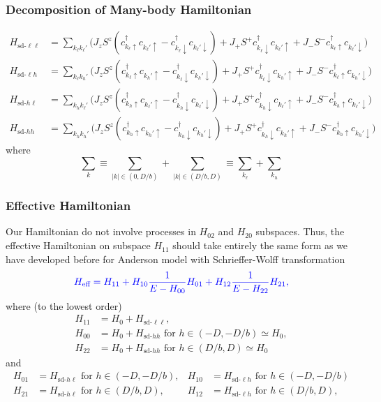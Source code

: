 \documentclass[10pt,aspectratio=43,xcolor=x11names,t]{beamer}%
\begin{document}
		\begin{frame}\frametitle{Decomposition of Many-body Hamiltonian}
			\begin{align*}
				H_{\text{sd-}\ell\ell}&=\sum_{k_\ell k_\ell'}\bigg(J_zS^z(c_{k_\ell\uparrow}^\dagger c_{k_\ell'\uparrow}-c_{k_\ell\downarrow}^\dagger c_{k_\ell'\downarrow})+J_+S^+c_{k_\ell\downarrow}^\dagger c_{k_\ell'\uparrow}+J_-S^-c_{k_\ell\uparrow}^\dagger c_{k_\ell'\downarrow}\bigg)\\
				H_{\text{sd-}\ell h}&=\sum_{k_\ell k_h'}\bigg(J_zS^z(c_{k_\ell\uparrow}^\dagger c_{k_h'\uparrow}-c_{k_\ell\downarrow}^\dagger c_{k_h'\downarrow})+J_+S^+c_{k_\ell\downarrow}^\dagger c_{k_h'\uparrow}+J_-S^-c_{k_\ell\uparrow}^\dagger c_{k_h'\downarrow}\bigg)\\
				H_{\text{sd-}h \ell}&=\sum_{k_h k_\ell'}\bigg(J_zS^z(c_{k_h\uparrow}^\dagger c_{k_\ell'\uparrow}-c_{k_h\downarrow}^\dagger c_{k_\ell'\downarrow})+J_+S^+c_{k_h\downarrow}^\dagger c_{k_\ell'\uparrow}+J_-S^-c_{k_h\uparrow}^\dagger c_{k_\ell'\downarrow}\bigg)\\
				H_{\text{sd-}h h}&=\sum_{k_h k_h'}\bigg(J_zS^z(c_{k_h\uparrow}^\dagger c_{k_h'\uparrow}-c_{k_h\downarrow}^\dagger c_{k_h'\downarrow})+J_+S^+c_{k_h\downarrow}^\dagger c_{k_h'\uparrow}+J_-S^-c_{k_h\uparrow}^\dagger c_{k_h'\downarrow}\bigg)
			\end{align*}
			where 
			\begin{equation*}
				\sum_k\equiv\sum_{|k|\in(0,D/b)}+\sum_{|k|\in(D/b,D)}\equiv\sum_{k_\ell}+\sum_{k_h}
			\end{equation*}
		\end{frame}
		\begin{frame}\frametitle{Effective Hamiltonian}
			Our Hamiltonian do not involve processes in $H_{02}$ and $H_{20}$ subspaces. Thus, the effective Hamiltonian on subspace $H_{11}$ should take entirely the same form as we have developed before for Anderson model with Schrieffer-Wolff transformation
			\begin{equation*}
				\color{blue}H_{\text{eff}}=H_{11}+H_{10}\dfrac{1}{E-H_{00}}H_{01}+H_{12}\dfrac{1}{E-H_{22}}H_{21},
			\end{equation*}
			where (to the lowest order)
			\begin{align*}
				H_{11}&=H_0+H_{\text{sd-}\ell\ell},\\
				H_{00}&=H_0+H_{\text{sd-}hh}\text{ for }h\in(-D,-D/b)\simeq H_0,\\
				H_{22}&=H_0+H_{\text{sd-}hh}\text{ for }h\in(D/b,D)\simeq H_0
			\end{align*}
			and
			\begin{align*}
				H_{01}&=H_{\text{sd-}h\ell}\text{ for }h\in(-D,-D/b), &H_{10}&=H_{\text{sd-}\ell h}\text{ for }h\in(-D,-D/b)\\
				H_{21}&=H_{\text{sd-}h\ell}\text{ for }h\in(D/b,D), &H_{12}&=H_{\text{sd-}\ell h}\text{ for }h\in(D/b,D),
			\end{align*}
		\end{frame}
\end{document}
